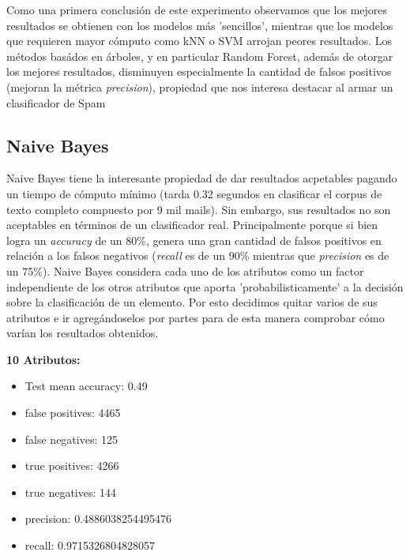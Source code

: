 \documentclass[10pt,a4paper]{article}
\begin{document}
Como una primera conclusión de este experimento observamos que los mejores resultados se obtienen con los modelos más 'sencillos', mientras que los modelos que requieren mayor cómputo como kNN o SVM arrojan peores resultados.
Los métodos basádos en árboles, y en particular Random Forest, además de otorgar los mejores resultados, disminuyen especialmente la cantidad de falsos positivos (mejoran la métrica \textit{precision}), propiedad que nos interesa destacar al armar un clasificador de Spam

\subsection{Naive Bayes}

Naive Bayes tiene la interesante propiedad de dar resultados acpetables pagando un tiempo de cómputo mínimo (tarda 0.32 segundos en clasificar el corpus de texto completo compuesto por 9 mil mails). Sin embargo, sus resultados no son aceptables en términos de un clasificador real. Principalmente porque si bien logra un \textit{accuracy} de un 80\%, genera una gran cantidad de falsos positivos en relación a los falsos negativos (\textit{recall} es de un 90\% mientras que \textit{precision} es de un 75\%). Naive Bayes considera cada uno de los atributos como un factor independiente de los otros atributos que aporta 'probabilisticamente' a la decisión sobre la clasificación de un elemento. Por esto decidimos quitar varios de sus atributos e ir agregándoselos por partes para de esta manera comprobar cómo varían los resultados obtenidos.

\textbf{10 Atributos:}
\begin{itemize}
	\item Test mean accuracy: 0.49
	\item false positives: 4465
	\item false negatives: 125
	\item true positives:  4266
	\item true negatives:  144
	\item precision: 0.4886038254495476
	\item recall: 0.9715326804828057
\end{itemize}
\end{document}
